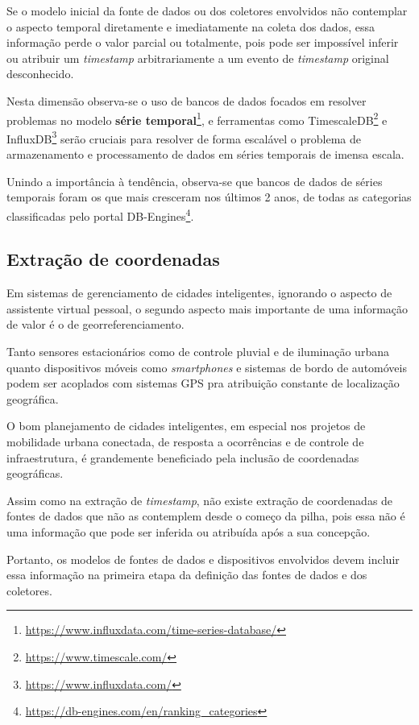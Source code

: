 Se o modelo inicial da fonte de dados ou dos coletores envolvidos não contemplar o aspecto temporal diretamente e imediatamente na coleta dos dados, essa informação perde o valor parcial ou totalmente, pois pode ser impossível inferir ou atribuir um \textit{timestamp} arbitrariamente a um evento de \textit{timestamp} original desconhecido.

Nesta dimensão observa-se o uso de bancos de dados focados em resolver problemas no modelo \textbf{série temporal}\footnote{\url{https://www.influxdata.com/time-series-database/}}, e ferramentas como TimescaleDB\footnote{\url{https://www.timescale.com/}} e InfluxDB\footnote{\url{https://www.influxdata.com/}} serão cruciais para resolver de forma escalável o problema de armazenamento e processamento de dados em séries temporais de imensa escala.

Unindo a importância à tendência, observa-se que bancos de dados de séries temporais foram os que mais cresceram nos últimos 2 anos, de todas as categorias classificadas pelo portal DB-Engines\footnote{\url{https://db-engines.com/en/ranking_categories}}.

\subsection{Extração de coordenadas} \label{ss:extracao_de_coordenadas}

Em sistemas de gerenciamento de cidades inteligentes, ignorando o aspecto de assistente virtual pessoal, o segundo aspecto mais importante de uma informação de valor é o de georreferenciamento.

Tanto sensores estacionários como de controle pluvial e de iluminação urbana quanto dispositivos móveis como \textit{smartphones} e sistemas de bordo de automóveis podem ser acoplados com sistemas GPS pra atribuição constante de localização geográfica.

O bom planejamento de cidades inteligentes, em especial nos projetos de mobilidade urbana conectada, de resposta a ocorrências e de controle de infraestrutura, é grandemente beneficiado pela inclusão de coordenadas geográficas.

Assim como na extração de \textit{timestamp}, não existe extração de coordenadas de fontes de dados que não as contemplem desde o começo da pilha, pois essa não é uma informação que pode ser inferida ou atribuída após a sua concepção. 

Portanto, os modelos de fontes de dados e dispositivos envolvidos devem incluir essa informação na primeira etapa da definição das fontes de dados e dos coletores.

